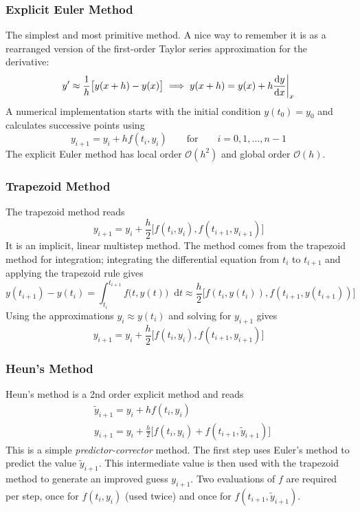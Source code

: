 \documentclass[11pt, a4paper]{article}
\newcommand{\diff}{\mathop{}\!\mathrm{d}} %
\newcommand{\eqtext}[1]{\qquad \text{#1} \qquad}
\renewcommand{\O}{\mathcal{O}}  %
\begin{document}
\subsubsection{Explicit Euler Method}
The simplest and most primitive method. A nice way to remember it is as a rearranged version of the first-order Taylor series approximation for the derivative:
\begin{equation*}
	y' \approx \frac{1}{h}\big[y(x+h) - y(x)\big] \implies y(x + h) = y(x) + h \dv{y}{x}\bigg |_{x}
\end{equation*}
A numerical implementation starts with the initial condition $ y(t_{0}) = y_{0} $ and calculates successive points using
\begin{equation*}
	y_{i+1} = y_{i} + hf(t_{i}, y_{i}) \eqtext{for} i = 0, 1, \ldots, n-1
\end{equation*}
The explicit Euler method has local order $ \O(h^{2}) $ and global order $ \O(h) $. 


\subsubsection{Trapezoid Method}
The trapezoid method reads
\begin{equation*}
	y_{i+1} = y_{i} + \frac{h}{2}\big[f(t_{i}, y_{i}), f(t_{i+1}, y_{i+1})\big]
\end{equation*}
It is an implicit, linear multistep method. The method comes from the trapezoid method for integration; integrating the differential equation from $ t_{i} $ to $ t_{i+1} $ and applying the trapezoid rule gives
\begin{equation*}
	y(t_{i+1}) - y(t_{i}) = \int_{t_{i}}^{t_{i+1}}f\big(t, y(t)\big)\diff t  \approx \frac{h}{2}\big[f(t_{i}, y(t_{i})), f(t_{i+1}, y(t_{i+1}))\big]
\end{equation*}
Using the approximations $ y_{i} \approx y(t_{i}) $ and solving for $ y_{i+1} $ gives
\begin{equation*}
		y_{i+1} = y_{i} + \frac{h}{2}\big[f(t_{i}, y_{i}), f(t_{i+1}, y_{i+1})\big]
\end{equation*}

\subsubsection{Heun's Method}
Heun's method is a 2nd order explicit method and reads
\begin{align*}
	&\tilde{y}_{i+1} = y_{i} + h f(t_{i}, y_{i})\\
	&y_{i+1} = y_{i} + \frac{h}{2}\big[f(t_{i}, y_{i}) + f(t_{i+1}, \tilde{y}_{i+1})\big]
\end{align*}
This is a simple \textit{predictor-corrector} method. The first step uses Euler's method to predict the value $ \tilde{y}_{i+1} $. This intermediate value is then used with the trapezoid method to generate an improved guess $ y_{i+1} $. Two evaluations of $ f $ are required per step, once for $ f(t_{i}, y_{i}) $ (used twice) and once for $ f(t_{i+1}, \tilde{y}_{i+1}) $. 
\end{document}
